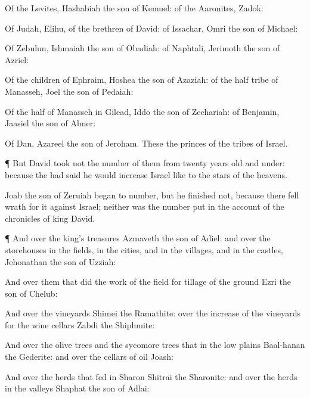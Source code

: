 {Of the
Levites,
Hashabiah the
son of
Kemuel: of the
Aaronites,
Zadok:

Of
Judah,
Elihu,
{} of the
brethren of
David: of
Issachar,
Omri the
son of
Michael:

Of
Zebulun,
Ishmaiah the
son of
Obadiah: of
Naphtali,
Jerimoth the
son of
Azriel:

Of the
children of
Ephraim,
Hoshea the
son of
Azaziah: of the
half
tribe of
Manasseh,
Joel the
son of
Pedaiah:

Of the
half
{} of
Manasseh in
Gilead,
Iddo the
son of
Zechariah: of
Benjamin,
Jaasiel the
son of
Abner:

Of
Dan,
Azareel the
son of
Jeroham. These
{} the
princes of the
tribes of
Israel.


\par }{\PP {}¶ But
David
took not the
number of them from
twenty
years
old and
under: because the
{} had
said he would
increase
Israel like to the
stars of the
heavens.

Joab the
son of
Zeruiah
began to
number, but he
finished not, because there fell
wrath for
it against
Israel; neither was the
number
put in the
account of the
chronicles of
king
David.


\par }{\PP {}¶ And over the
king’s
treasures
{}
Azmaveth the
son of
Adiel: and over the
storehouses in the
fields, in the
cities, and in the
villages, and in the
castles,
{}
Jehonathan the
son of
Uzziah:

And over them that
did the
work of the
field for
tillage of the
ground
{}
Ezri the
son of
Chelub:

And over the
vineyards
{}
Shimei the
Ramathite: over the increase of the
vineyards for the
wine
cellars
{}
Zabdi the
Shiphmite:

And over the olive
trees and the sycomore
trees that
{} in the low
plains
{}
Baal-hanan the
Gederite: and over the
cellars of
oil
{}
Joash:

And over the
herds that
fed in
Sharon
{}
Shitrai the
Sharonite: and over the
herds
{} in the
valleys
{}
Shaphat the
son of
Adlai:

}
